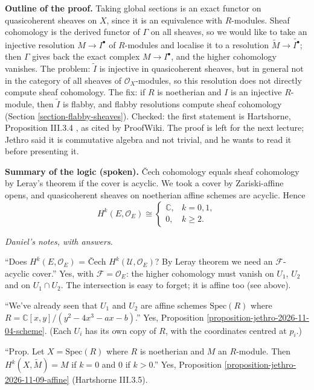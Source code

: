 \noindent
{\bf Outline of the proof.} Taking global
sections is an exact functor on quasicoherent
sheaves on $X$, since it is an equivalence
with $R$-modules. Sheaf cohomology is the
derived functor of $\Gamma$ on all sheaves,
so we would like to take an injective
resolution $M\to I^\bullet$ of $R$-modules
and localise it to a resolution
$\widetilde{M}\to\widetilde{I^\bullet}$; then
$\Gamma$ gives back the exact complex
$M\to I^\bullet$, and the higher cohomology
vanishes. The problem: $\widetilde{I}$ is
injective in quasicoherent sheaves, but in
general not in the category of all sheaves of
$\mathcal{O}_X$-modules, so this resolution
does not directly compute sheaf cohomology.
The fix: if $R$ is noetherian and $I$ is an
injective $R$-module, then $\widetilde{I}$ is
flabby, and flabby resolutions compute sheaf
cohomology (Section
\ref{section-flabby-sheaves}). Checked: the
first statement is Hartshorne, Proposition
III.3.4 \cite{har}, as cited by ProofWiki.
The proof is left for the next lecture;
Jethro
said it is commutative algebra and not
trivial, and he wants to read it before
presenting it.

\medskip\noindent
{\bf Summary of the logic (spoken).}
\v{C}ech cohomology equals sheaf cohomology
by
Leray's theorem if the cover is acyclic. We
took a cover by Zariski-affine opens, and
quasicoherent sheaves on noetherian affine
schemes are acyclic. Hence
$$
H^k(E,\mathcal{O}_E)\cong
\begin{cases}
\mathbb{C}, & k=0,1,\\
0, & k\geq 2.
\end{cases}
$$

\medskip\noindent
\textit{Daniel's notes, with answers.}

``Does $H^k(E,\mathcal{O}_E)$ = \v{C}ech
$H^k(\mathcal{U},\mathcal{O}_E)$? By Leray
theorem we need an $\mathcal{F}$-acyclic
cover.'' Yes, with
$\mathcal{F}=\mathcal{O}_E$:
the higher cohomology must vanish on $U_1$,
$U_2$ and on $U_1\cap U_2$. The intersection
is easy to forget; it is affine too (see
above).

``We've already seen that $U_1$ and $U_2$ are
affine schemes $\mathrm{Spec}(R)$ where
$R=\mathbb{C}[x,y]/(y^2-4x^3-ax-b)$.'' Yes,
Proposition
\ref{proposition-jethro-2026-11-04-scheme}.
(Each $U_i$ has its own copy of $R$, with the
coordinates centred at $p_i$.)

``Prop. Let $X=\mathrm{Spec}(R)$ where $R$ is
noetherian and $M$ an $R$-module. Then
$H^k(X,\widetilde{M})=M$ if $k=0$ and $0$ if
$k>0$.'' Yes, Proposition
\ref{proposition-jethro-2026-11-09-affine}
(Hartshorne III.3.5).


